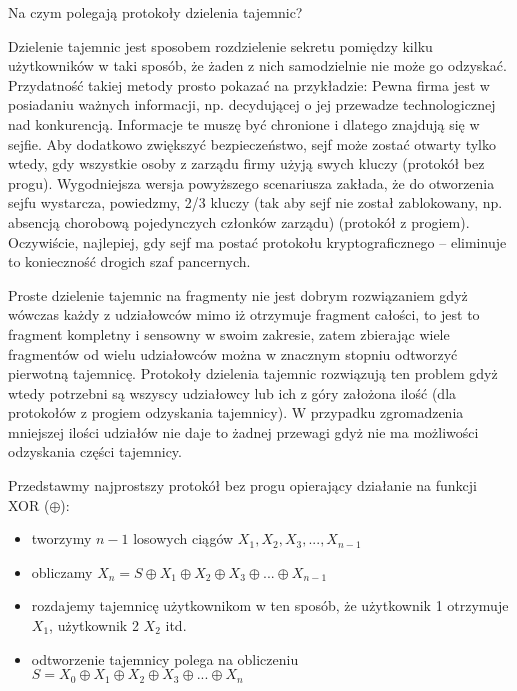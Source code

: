 \documentclass[answers,11pt]{exam}
\begin{document}
\begin{questions}

\question Na czym polegają protokoły dzielenia tajemnic? 
\begin{solution}
Dzielenie tajemnic jest sposobem rozdzielenie sekretu pomiędzy kilku użytkowników w taki sposób, że żaden z nich samodzielnie nie może go odzyskać. Przydatność takiej metody prosto pokazać na przykładzie: Pewna firma jest w posiadaniu ważnych informacji, np. decydującej o jej przewadze technologicznej nad konkurencją. Informacje te muszę być chronione i dlatego znajdują się w sejfie. Aby dodatkowo zwiększyć bezpieczeństwo, sejf może zostać otwarty tylko wtedy, gdy wszystkie osoby z zarządu firmy użyją swych kluczy (protokół bez progu). Wygodniejsza wersja powyższego scenariusza zakłada, że do otworzenia sejfu wystarcza, powiedzmy, 2/3 kluczy (tak aby sejf nie został zablokowany, np. absencją chorobową pojedynczych członków zarządu) (protokół z progiem). Oczywiście, najlepiej, gdy sejf ma postać protokołu kryptograficznego – eliminuje to konieczność drogich szaf pancernych.
\end{solution}

\begin{solution}
Proste dzielenie tajemnic na fragmenty nie jest dobrym rozwiązaniem gdyż wówczas każdy z udziałowców mimo iż otrzymuje fragment całości, to jest to fragment kompletny i sensowny w swoim zakresie, zatem zbierając wiele fragmentów od wielu udziałowców można w znacznym stopniu odtworzyć pierwotną tajemnicę. Protokoły dzielenia tajemnic rozwiązują ten problem gdyż wtedy potrzebni są wszyscy udziałowcy lub ich z góry założona ilość (dla protokołów z progiem odzyskania tajemnicy). W przypadku zgromadzenia mniejszej ilości udziałów nie daje to żadnej przewagi gdyż nie ma możliwości odzyskania części tajemnicy.
\end{solution}

\begin{solution}
Przedstawmy najprostszy protokół bez progu opierający działanie na funkcji XOR ($\oplus$):
\begin{itemize}
\item tworzymy $n-1$ losowych ciągów $X_1, X_2, X_3, ..., X_{n-1}$
\item obliczamy $X_n = S \oplus X_1 \oplus X_2 \oplus X_3 \oplus ... \oplus X_{n-1}$ 
\item rozdajemy tajemnicę użytkownikom w ten sposób, że użytkownik 1 otrzymuje $X_1$, użytkownik 2 $X_2$ itd.
\item odtworzenie tajemnicy polega na obliczeniu $S = X_0 \oplus X_1 \oplus X_2 \oplus X_3 \oplus ... \oplus X_{n}$
\end{itemize}
\end{solution}


\end{questions}
\end{document}
